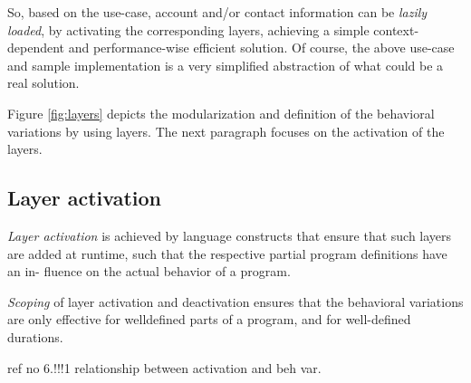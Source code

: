 \documentclass{acm_proc_article-sp}
\begin{document}
So, based on the use-case, account and/or contact information can be \textit{lazily loaded}, by activating the corresponding layers, achieving a simple context-dependent and performance-wise efficient solution. Of course, the above use-case and sample implementation is a very simplified abstraction of what could be a real solution.

Figure \ref{fig:layers} depicts the modularization and definition of the behavioral variations by using layers. The next paragraph focuses on the activation of the layers.

\subsection{Layer activation}
\label{sec:layer_activation}
\textit{Layer activation} is achieved by language constructs that
ensure that such layers are added at runtime, such that
the respective partial program definitions have an in-
fluence on the actual behavior of a program.

\textit{Scoping} of layer activation and deactivation ensures that
the behavioral variations are only effective for welldefined
parts of a program, and for well-defined durations.

ref no 6.!!!1 relationship between activation and beh var.



\end{document}
